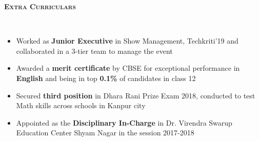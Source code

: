 \documentclass[9pt]{article}
\newenvironment{changemargin}[2]{%
  \begin{list}{}{%
    \setlength{\topsep}{2pt}%
    \setlength{\leftmargin}{#1}%
    \setlength{\rightmargin}{#2}%
    \setlength{\listparindent}{\parindent}%
    \setlength{\itemindent}{\parindent}%
    \setlength{\parsep}{\parskip}%
  }%
  \item[]}{\end{list}
}
\newcommand{\lineover}{
	\begin{changemargin}{0in}{0in}
		\vspace*{-18pt}
		\hrulefill \\
		\vspace*{-8pt}
	\end{changemargin}
}
\newcommand{\header}[1]{
	\begin{changemargin}{-0.5in}{-0.5in}
	\vspace{-4pt}
		\Large\bfseries\scshape{#1}\hrulefill
  	\lineover
	\end{changemargin}
}
\newenvironment{body} {
	\vspace*{-16pt}
	\begin{changemargin}{-0.4in}{-0.5in}
  }	
	{\end{changemargin}
}
\begin{document}
\header{Extra Curriculars}
\begin{body}
\vspace{17pt}
\begin{itemize} \itemsep -1pt
    \itemindent=-1.0em
    \item Worked as \textbf{Junior Executive} in Show Management, Techkriti'19 and collaborated in a 3-tier team to manage the event
    \item Awarded a \textbf{merit certificate} by CBSE for exceptional performance in \textbf{English} and being in top \textbf{0.1\%} of candidates in class 12
    \item Secured \textbf{third position} in Dhara Rani Prize Exam 2018, conducted to test Math skills across schools in Kanpur city
    \item Appointed as the \textbf{Disciplinary In-Charge} in Dr. Virendra Swarup Education Center Shyam Nagar in the session 2017-2018
\end{itemize}
\end{body}
\end{document}
